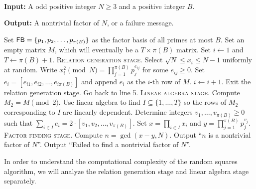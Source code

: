 \begin{algo}~

    {\bf Input:} A odd positive integer $N \geq 3$ and a positive integer $B$. 
    
    {\bf Output:} A nontrivial factor of $N$, or a failure message. \vspace{0.5em}
    
    \begin{algorithmic}[1]
        \State Set ${\sf FB} = \{p_1, p_2, \dots, p_{\pi(B)}\}$ as the factor 
        basis of all primes at most $B$. 
        \State Set an empty matrix $M$, which will eventually be a $T \times 
        \pi(B)$ matrix. 
        \State Set $i \gets 1$ and $T \gets \pi(B) + 1$. 
        \State 
        \State \textsc{Relation generation stage.} 
        \Indent
            \State Select $\sqrt{N} \leq x_i \leq N-1$ uniformly at random. 
                \State Write $x_i^2 \pmod N = \prod_{j=1}^{\pi(B)} p_j^{e_{ij}}$ 
                for some $e_{ij} \geq 0$. 
                \State Set $e_i = [e_{i1}, e_{i2}, \dots, e_{i\pi(B)}]$ and append 
                $e_i$ as the $i$-th row of $M$.
                \State $i \gets i+1$. 
            \EndIf 
                \State Exit the relation generation stage. 
            \Else
                \State Go back to line 5. 
            \EndIf
        \EndIndent 
        \State 
        \State \textsc{Linear algebra stage.} 
        \Indent 
            \State Compute $M_2 = M \pmod 2$. 
            \State Use linear algebra to find $I \subseteq \{1, \dots, T\}$ 
            so the rows of $M_2$ corresponding to $I$ are linearly 
            dependent. 
            \State Determine integers $v_1, \dots, v_{\pi(B)} \geq 0$ such that 
            $\sum_{i \in I} e_i = 2 \cdot [v_1, v_2, \dots, v_{\pi(B)}]$. 
            \State Set $x = \prod_{i\in I} x_i$ and $y = \prod_{j=1}^{\pi(B)} 
            p_j^{v_j}$. 
        \EndIndent
        \State 
        \State \textsc{Factor finding stage.} 
        \Indent 
            \State Compute $n = \gcd(x-y, N)$. 
                \State Output ``$n$ is a nontrivial factor of $N$''.
            \Else 
                \State Output ``Failed to find a nontrivial factor of $N$''. 
            \EndIf 
        \EndIndent
    \end{algorithmic}
\end{algo}

In order to understand the computational complexity of the random squares 
algorithm, we will analyze the relation generation stage and linear algebra 
stage separately. 

